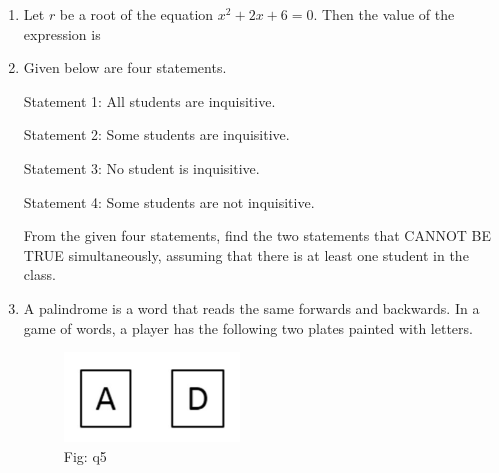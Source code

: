 \begin{enumerate}
\hfill{}

\item Let $r$ be a root of the equation $x^2 + 2x + 6 = 0$. Then the value of the expression  is  

\begin{enumerate}
\end{enumerate}

\hfill{}

\item Given below are four statements.  

Statement 1: All students are inquisitive.  

Statement 2: Some students are inquisitive.  

Statement 3: No student is inquisitive.  

Statement 4: Some students are not inquisitive.  

From the given four statements, find the two statements that CANNOT BE TRUE simultaneously, assuming that there is at least one student in the class.  

\begin{enumerate}
\end{enumerate}

\hfill{}

\item A palindrome is a word that reads the same forwards and backwards. In a game of words, a player has the following two plates painted with letters.  
\begin{figure}[H]
\centering
\includegraphics[width=0.4\columnwidth]{figs/q5-1.png}
\caption{Fig: q5}
\label{fig:q5}
\end{figure}


\end{enumerate}
